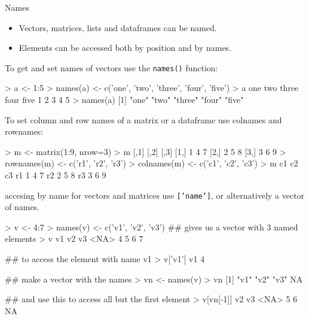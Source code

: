 \documentclass[pdf]{beamer}
\begin{document}
\begin{frame}[fragile]{Names}
  
  {\small
  \begin{itemize}
  \item Vectors, matrices, lists and dataframes can be named.
  \item Elements can be accessed both by position and by names.
  \end{itemize}
  
  To get and set names of vectors use the \texttt{names()}
  function:
  }
  \begin{rcode}
    > a <- 1:5
    > names(a) <- c('one', 'two', 'three', 'four', 'five')
    > a
    one   two three  four  five 
      1     2     3     4     5 
    > names(a)
    [1] "one"   "two"   "three" "four"  "five" 
  \end{rcode}

  {\small
  To set column and row names of a matrix or a dataframe use colnames
  and rownames:
  }
  \begin{rcode}
    > m <- matrix(1:9, nrow=3)
    > m
         [,1] [,2] [,3]
    [1,]    1    4    7
    [2,]    2    5    8
    [3,]    3    6    9
    > rownames(m) <- c('r1', 'r2', 'r3')
    > colnames(m) <- c('c1', 'c2', 'c3')
    > m
       c1 c2 c3
    r1  1  4  7
    r2  2  5  8
    r3  3  6  9
  \end{rcode}

\end{frame}

\begin{frame}[fragile]{accesing by name}
  for vectors and matrices use \texttt{['name']},
  or alternatively a vector of names.

  \begin{rcode}
    > v <- 4:7
    > names(v) <- c('v1', 'v2', 'v3')
    ## gives us a vector with 3 named elements
    > v
    v1   v2   v3 <NA> 
    4    5    6    7 

    ## to access the element with name v1
    > v['v1']
    v1 
    4 

    ## make a vector with the names
    > vn <- names(v)
    > vn
    [1] "v1" "v2" "v3" NA  

    ## and use this to access all but the first element
    > v[vn[-1]]
    v2   v3 <NA> 
    5    6   NA 
  \end{rcode}
\end{frame}
\end{document}
